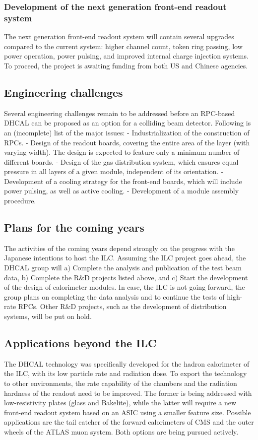 \subsubsection{Development of the next generation front-end readout system}
The next generation front-end readout system will contain several upgrades compared to the current system: higher channel count, token ring passing, low power operation, power pulsing, and improved internal charge injection systems. To proceed, the project is awaiting funding from both US and Chinese agencies.

\subsection{Engineering challenges}
Several engineering challenges remain to be addressed before an RPC-based DHCAL can be proposed as an option for a colliding beam detector. Following is an (incomplete) list of the major issues:
-   Industrialization of the construction of RPCs.
-   Design of the readout boards, covering the entire area of the layer (with varying width). The design is expected to feature only a minimum number of different boards.
-   Design of the gas distribution system, which ensures equal pressure in all layers of a given module, independent of its orientation.
-   Development of a cooling strategy for the front-end boards, which will include power pulsing, as well as active cooling.
-   Development of a module assembly procedure.

\subsection{Plans for the coming years}
The activities of the coming years depend strongly on the progress with the Japanese intentions to host the ILC. Assuming the ILC project goes ahead, the DHCAL group will
a)  Complete the analysis and publication of the test beam data,
b)  Complete the R\&D projects listed above, and
c)  Start the development of the design of calorimeter modules.
In case, the ILC is not going forward, the group plans on completing the data analysis and to continue the tests of high-rate RPCs. Other R\&D projects, such as the development of distribution systems, will be put on hold.

\subsection{Applications beyond the ILC}
The DHCAL technology was specifically developed for the hadron calorimeter of the ILC, with its low particle rate and radiation dose. To export the technology to other environments, the rate capability of the chambers and the radiation hardness of the readout need to be improved. The former is being addressed with low-resistivity plates (glass and Bakelite), while the latter will require a new front-end readout system based on an ASIC using a smaller feature size. Possible applications are the tail catcher of the forward calorimeters of CMS and the outer wheels of the ATLAS muon system. Both options are being pursued actively.

